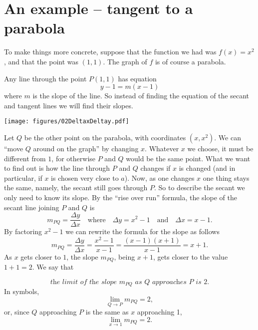 \section{An example -- tangent to a parabola}
\label{sec:tangent-to-parabola}
To make things more concrete, suppose that the function we had was $f(x)=x^2$, and that
the point was $(1, 1)$.  The graph of $f$ is of course a parabola.

Any line through the point $P(1,1)$ has equation
\[
y-1 = m(x-1)
\]
where $m$ is the slope of the line.  So instead of finding the equation of the secant and
tangent lines we will find their slopes.

\begin{center}
  \texttt{[image: figures/02DeltaxDeltay.pdf]}
\end{center}

Let $Q$ be the other point on the parabola, with coordinates $(x, x^2)$.  We can
``move $Q$ around on the graph'' by changing $x$. Whatever $x$ we choose, it
must be different from $1$, for otherwise $P$ and $Q$ would be the same point.
What we want to find out is how the line through $P$ and $Q$ changes if $x$ is
changed (and in particular, if $x$ is chosen very close to $a$).  Now, as one
changes $x$ one thing stays the same, namely, the secant still goes through $P$.
So to describe the secant we only need to know its slope.  By the ``rise over
run'' formula, the slope of the secant line joining $P$ and $Q$ is
\[
  m_{PQ}= \frac{\Delta y}{\Delta x}
  \quad\text{where}\quad
  \Delta y=x^2-1
  \quad\text{and}\quad
  \Delta x = x-1.
\]
By factoring $x^2-1$ we can rewrite the formula for the slope as follows
\begin{equation}\label{eq:secant-slope-simplified}
  m_{PQ}= \frac{\Delta y}{\Delta x}
  =\frac{x^2-1}{x-1}
  =\frac{(x-1)(x+1)}{x-1}
  = x+1.
\end{equation}
As $x$ gets closer to $1$, the slope $m_{PQ}$, being $x+1$, gets closer to the
value $1+1 = 2$.  We say that

\begin{equation*}
  \textit{the limit of the slope $m_{PQ}$ as $Q$ approaches $P$ is $2$.}
\end{equation*}
In symbols,
\[
\lim_{Q\to P} m_{PQ} = 2,
\]
or, since $Q$ approaching $P$ is the same as $x$ approaching 1,
\begin{equation}\label{eq:tangent-slope-found}
  \lim_{x\to 1} m_{PQ} = 2.
\end{equation}


